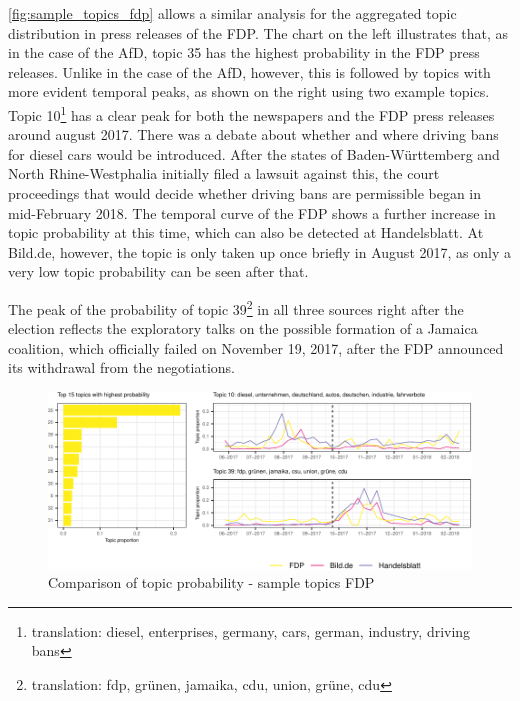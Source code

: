 \documentclass[
  12pt,
]{article}
\begin{document}
\autoref{fig:sample_topics_fdp} allows a similar analysis for the
aggregated topic distribution in press releases of the FDP. The chart on
the left illustrates that, as in the case of the AfD, topic 35 has the
highest probability in the FDP press releases. Unlike in the case of the
AfD, however, this is followed by topics with more evident temporal
peaks, as shown on the right using two example topics. Topic
10\footnote{translation: diesel, enterprises, germany, cars, german,
  industry, driving bans} has a clear peak for both the newspapers and
the FDP press releases around august 2017. There was a debate about
whether and where driving bans for diesel cars would be introduced.
After the states of Baden-Württemberg and North Rhine-Westphalia
initially filed a lawsuit against this, the court proceedings that would
decide whether driving bans are permissible began in mid-February 2018.
The temporal curve of the FDP shows a further increase in topic
probability at this time, which can also be detected at Handelsblatt. At
Bild.de, however, the topic is only taken up once briefly in August
2017, as only a very low topic probability can be seen after that.

The peak of the probability of topic 39\footnote{translation: fdp,
  grünen, jamaika, cdu, union, grüne, cdu} in all three sources right
after the election reflects the exploratory talks on the possible
formation of a Jamaica coalition, which officially failed on November
19, 2017, after the FDP announced its withdrawal from the negotiations.

\begin{figure}

{\centering \includegraphics[width=1\linewidth]{main_text_files/figure-latex/Top FDP topics-1} 

}

\caption{Comparison of topic probability - sample topics FDP \label{fig:sample_topics_fdp}}\label{fig:Top FDP topics}
\end{figure}
\end{document}
